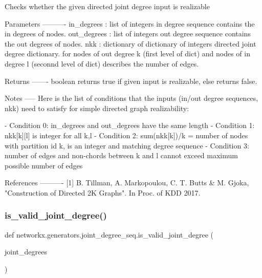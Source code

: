\begin{DoxyVerb}Checks whether the given directed joint degree input is realizable

Parameters
----------
in_degrees :  list of integers
    in degree sequence contains the in degrees of nodes.
out_degrees : list of integers
    out degree sequence contains the out degrees of nodes.
nkk  :  dictionary of dictionary of integers
    directed joint degree dictionary. for nodes of out degree k (first
    level of dict) and nodes of in degree l (seconnd level of dict)
    describes the number of edges.

Returns
-------
boolean
    returns true if given input is realizable, else returns false.

Notes
-----
Here is the list of conditions that the inputs (in/out degree sequences,
nkk) need to satisfy for simple directed graph realizability:

- Condition 0: in_degrees and out_degrees have the same length
- Condition 1: nkk[k][l]  is integer for all k,l
- Condition 2: sum(nkk[k])/k = number of nodes with partition id k, is an
               integer and matching degree sequence
- Condition 3: number of edges and non-chords between k and l cannot exceed
               maximum possible number of edges


References
----------
[1] B. Tillman, A. Markopoulou, C. T. Butts & M. Gjoka,
    "Construction of Directed 2K Graphs". In Proc. of KDD 2017.
\end{DoxyVerb}
 \mbox{\label{namespacenetworkx_1_1generators_1_1joint__degree__seq_a1dac8f1785811efb523049d51ec554e1}} 
\subsubsection{\texorpdfstring{is\+\_\+valid\+\_\+joint\+\_\+degree()}{is\_valid\_joint\_degree()}}
{\footnotesize\ttfamily def networkx.\+generators.\+joint\+\_\+degree\+\_\+seq.\+is\+\_\+valid\+\_\+joint\+\_\+degree (\begin{DoxyParamCaption}\item[{}]{joint\+\_\+degrees }\end{DoxyParamCaption})}


